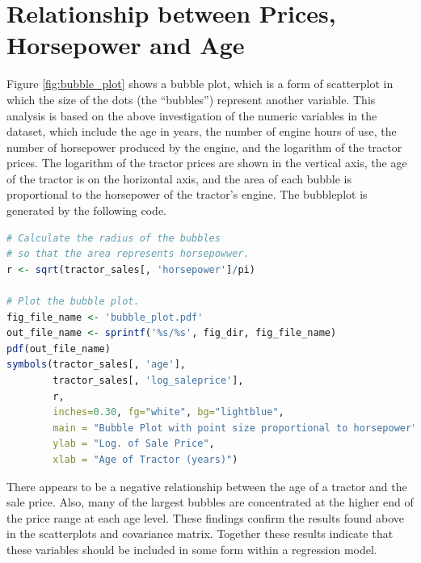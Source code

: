 \documentclass[11pt]{book}
\begin{document}
\pagebreak
\section{Relationship between Prices, Horsepower and Age}


Figure \ref{fig:bubble_plot}
shows a bubble plot, 
which is a form of scatterplot in which the size of the dots (the ``bubbles'')
represent another variable.
This analysis is based on the above investigation
of the numeric variables in the dataset, 
which include 
the age in years, the number of engine hours of use, 
the number of horsepower produced by the engine, 
and the logarithm of the tractor prices. 
The logarithm of the tractor prices are shown in the vertical axis, 
the age of the tractor is on the horizontal axis, 
and the area of each bubble is proportional
to the horsepower of the tractor's engine. 
The bubbleplot is
generated by the following code.

\vfill

\begin{lstlisting}[language=R]
# Calculate the radius of the bubbles
# so that the area represents horsepowwer.
r <- sqrt(tractor_sales[, 'horsepower']/pi)

# Plot the bubble plot.
fig_file_name <- 'bubble_plot.pdf'
out_file_name <- sprintf('%s/%s', fig_dir, fig_file_name)
pdf(out_file_name)
symbols(tractor_sales[, 'age'],
        tractor_sales[, 'log_saleprice'],
        r,
        inches=0.30, fg="white", bg="lightblue",
        main = "Bubble Plot with point size proportional to horsepower",
        ylab = "Log. of Sale Price",
        xlab = "Age of Tractor (years)")
\end{lstlisting}


\pagebreak

There appears to be a negative relationship between
the age of a tractor and the sale price.
Also, many of the largest bubbles are concentrated at the higher end of 
the price range at each age level. 
These findings confirm the results found above in the scatterplots
and covariance matrix. 
Together these results indicate that these variables should be included
in some form within a regression model. 
\end{document}
